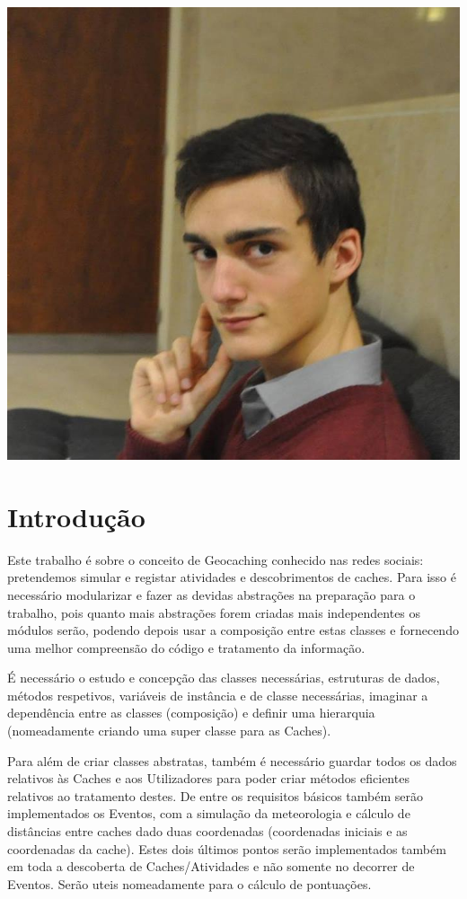 \documentclass[a4paper,12pt]{article}
\begin{document}
\begin{center}
\includegraphics[height=3\baselineskip,natwidth=369,natheight=430]{martinho.jpg}
\end{center}

\pagebreak


\tableofcontents

\pagebreak

\section{Introdução}

\quad
Este trabalho é sobre o conceito de Geocaching conhecido nas redes sociais: pretendemos simular e registar atividades e descobrimentos de caches. Para isso é necessário modularizar e fazer as devidas abstrações na preparação para o trabalho, pois quanto mais abstrações forem criadas mais independentes os módulos serão, podendo depois usar a composição entre estas classes e fornecendo uma melhor compreensão do código e tratamento da informação.
\par
É necessário o estudo e concepção das classes necessárias, estruturas de dados, métodos respetivos, variáveis de instância e de classe necessárias, imaginar a dependência entre as classes (composição) e definir uma hierarquia (nomeadamente criando uma super classe para as Caches).
\par
Para além de criar classes abstratas, também é necessário guardar todos os dados relativos às Caches e aos Utilizadores para poder criar métodos eficientes relativos ao tratamento destes.
De entre os requisitos básicos também serão implementados os Eventos, com a simulação da meteorologia e cálculo de distâncias entre caches dado duas coordenadas (coordenadas iniciais e as coordenadas da cache). Estes dois últimos pontos serão implementados também em toda a descoberta de Caches/Atividades e não somente no decorrer de Eventos. Serão uteis nomeadamente para o cálculo de pontuações.
\end{document}
